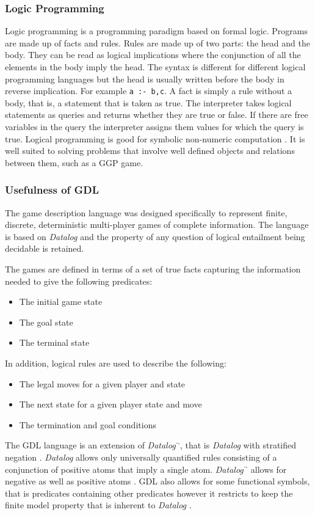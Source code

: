 \subsubsection{Logic Programming}
Logic programming is a programming paradigm based on formal logic. Programs are made up of facts and rules. Rules are made up of two parts: the head and the body. They can be read as logical implications where the conjunction of all the elements in the body imply the head. The syntax is different for different logical programming languages but the head is usually written before the body in reverse implication. For example \texttt{a :- b,c}. A fact is simply a rule without a body, that is, a statement that is taken as true. The interpreter takes logical statements as queries and returns whether they are true or false. If there are free variables in the query the interpreter assigns them values for which the query is true. Logical programming is good for symbolic non-numeric computation \cite{Bratko}. It is well suited to solving problems that involve well defined objects and relations between them, such as a GGP game.
\subsubsection{Usefulness of GDL}
The game description language was designed specifically to represent finite, discrete, deterministic multi-player games of complete information. The language is based on \textit{Datalog} and the property of any question of logical entailment being decidable is retained.

The games are defined in terms of a set of true facts capturing the information needed to give the following predicates:
\begin{itemize}
\item The initial game state
\item The goal state
\item The terminal state
\end{itemize}
In addition, logical rules are used to describe the following:
\begin{itemize}
\item The legal moves for a given player and state
\item The next state for a given player state and move
\item The termination and goal conditions
\end{itemize}

The GDL language is an extension of \textit{Datalog$^{\neg}$}, that is \textit{Datalog} with stratified negation \cite{GDL_Spec}. \textit{Datalog} allows only universally quantified rules consisting of a conjunction of positive atoms that imply a single atom. \textit{Datalog$^{\neg}$} allows for negative as well as positive atoms \cite{Alice/Foundations}. GDL also allows for some functional symbols, that is predicates containing other predicates however it restricts to keep the finite model property that is inherent to \textit{Datalog} \cite{GDL_Spec}.

